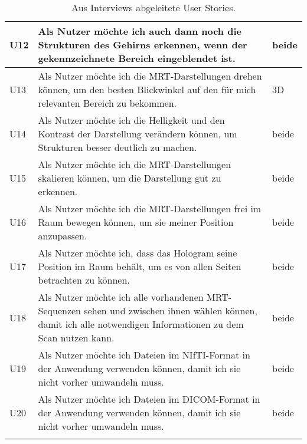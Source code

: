 \begin{longtable}{p{}p{}p{}}
\midrule
U12 & Als Nutzer möchte ich auch dann noch die Strukturen des Gehirns erkennen, wenn der gekennzeichnete Bereich eingeblendet ist. & beide\\
\midrule 
U13 & Als Nutzer möchte ich die MRT-Darstellungen drehen können, um den besten Blickwinkel auf den für mich relevanten Bereich zu bekommen. & 3D\\
\midrule 
U14 & Als Nutzer möchte ich die Helligkeit und den Kontrast der Darstellung verändern können, um Strukturen besser deutlich zu machen. & beide\\
\midrule 
U15 & Als Nutzer möchte ich die MRT-Darstellungen skalieren können, um die Darstellung gut zu erkennen. & beide\\
\midrule 
U16 & Als Nutzer möchte ich die MRT-Darstellungen frei im Raum bewegen können, um sie meiner Position anzupassen. & beide\\
\midrule 
U17 & Als Nutzer möchte ich, dass das Hologram seine Position im Raum behält, um es von allen Seiten betrachten zu können. & beide\\
\midrule 
U18 & Als Nutzer möchte ich alle vorhandenen MRT-Sequenzen sehen und zwischen ihnen wählen können, damit ich alle notwendigen Informationen zu dem Scan nutzen kann. & beide \\
\midrule 
U19 & Als Nutzer möchte ich Dateien im NIfTI-Format in der Anwendung verwenden können, damit ich sie nicht vorher umwandeln muss. & beide\\
\midrule 
U20 & Als Nutzer möchte ich Dateien im DICOM-Format in der Anwendung verwenden können, damit ich sie nicht vorher umwandeln muss. & beide\\

\bottomrule
\caption{\label{tab:userStories}Aus Interviews abgeleitete User Stories.}
\end{longtable}

